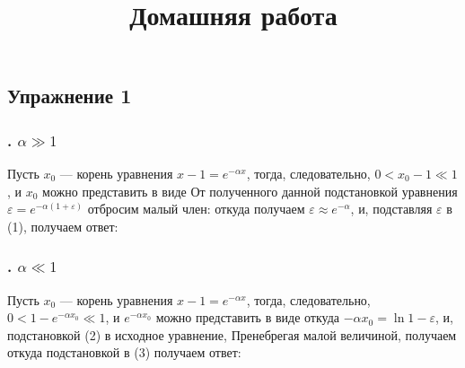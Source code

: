 \documentclass[a4paper, 12pt]{article}
\title{Домашняя работа \textnumero }
\author{}
\date{}
\begin{document}
\maketitle\thispagestyle{fancy}

\subsection*{Упражнение 1}
\subsubsection*{. $\alpha \gg 1$}
Пусть $x_0$ --- корень уравнения $x-1 = e^{-\alpha x}$, тогда,
следовательно, $0 < x_0 - 1 \ll 1$, и $x_0$ можно представить в виде
От полученного данной подстановкой уравнения $\varepsilon = e^{-\alpha(1 + \varepsilon)}$ отбросим малый член:
откуда получаем $\varepsilon \approx e^{-\alpha}$, и, подставляя $\varepsilon$ в (1), получаем ответ:

\subsubsection*{. $\alpha \ll 1$}
Пусть $x_0$ --- корень уравнения $x-1 = e^{-\alpha x}$, тогда,
следовательно, $0 < 1 - e^{-\alpha x_0} \ll 1$, и $e^{-\alpha x_0}$ можно представить в виде
откуда $-\alpha x_0 = \ln{1 - \varepsilon}$, и, подстановкой (2) в исходное уравнение,
Пренебрегая малой величиной, получаем
откуда подстановкой в (3) получаем ответ:
\end{document}
